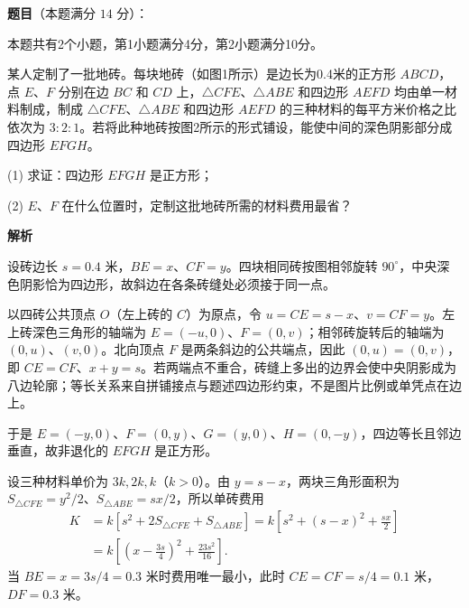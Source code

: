\begin{answer}

\textbf{题目}（本题满分 $14$ 分）：

本题共有2个小题，第1小题满分4分，第2小题满分10分。

某人定制了一批地砖。每块地砖（如图1所示）是边长为0.4米的正方形 $ABCD$，点 $E$、$F$ 分别在边 $BC$ 和 $CD$ 上，$\triangle CFE$、$\triangle ABE$ 和四边形 $AEFD$ 均由单一材料制成，制成 $\triangle CFE$、$\triangle ABE$ 和四边形 $AEFD$ 的三种材料的每平方米价格之比依次为 $3:2:1$。若将此种地砖按图2所示的形式铺设，能使中间的深色阴影部分成四边形 $EFGH$。

(1) 求证：四边形 $EFGH$ 是正方形；

(2) $E$、$F$ 在什么位置时，定制这批地砖所需的材料费用最省？
\nopagebreak[4]
\begin{center}\end{center}
\nopagebreak[4]
\textbf{解析}


设砖边长 $s=0.4$ 米，$BE=x$、$CF=y$。四块相同砖按图相邻旋转 $90^\circ$，中央深色阴影恰为四边形，故斜边在各条砖缝处必须接于同一点。

以四砖公共顶点 $O$（左上砖的 $C$）为原点，令 $u=CE=s-x$、$v=CF=y$。左上砖深色三角形的轴端为 $E=(-u,0)$、$F=(0,v)$；相邻砖旋转后的轴端为 $(0,u)$、$(v,0)$。北向顶点 $F$ 是两条斜边的公共端点，因此 $(0,u)=(0,v)$，即 $CE=CF$、$x+y=s$。若两端点不重合，砖缝上多出的边界会使中央阴影成为八边轮廓；等长关系来自拼铺接点与题述四边形约束，不是图片比例或单凭点在边上。

于是 $E=(-y,0)$、$F=(0,y)$、$G=(y,0)$、$H=(0,-y)$，四边等长且邻边垂直，故非退化的 $EFGH$ 是正方形。


设三种材料单价为 $3k,2k,k$（$k>0$）。由 $y=s-x$，两块三角形面积为 $S_{\triangle CFE}=y^2/2$、$S_{\triangle ABE}=sx/2$，所以单砖费用
\nopagebreak[4]
\[
\begin{aligned}
K&=k\left[s^2+2S_{\triangle CFE}+S_{\triangle ABE}\right]
 =k\left[s^2+(s-x)^2+\frac{sx}{2}\right]\\
 &=k\left[\left(x-\frac{3s}{4}\right)^2+\frac{23s^2}{16}\right].
\end{aligned}
\]
当 $BE=x=3s/4=0.3$ 米时费用唯一最小，此时 $CE=CF=s/4=0.1$ 米，$DF=0.3$ 米。



\end{answer}
